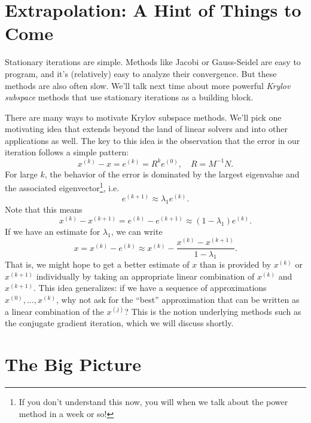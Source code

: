 \documentclass[12pt, leqno]{article}
\begin{document}

\section{Extrapolation: A Hint of Things to Come}

Stationary iterations are simple.  Methods like Jacobi or Gauss-Seidel
are easy to program, and it's (relatively) easy to analyze their
convergence.  But these methods are also often slow.  We'll talk next
time about more powerful {\em Krylov subspace} methods that use
stationary iterations as a building block.

There are many ways to motivate Krylov subspace methods.  We'll
pick one motivating idea that extends beyond
the land of linear solvers and into other applications as well.
The key to this idea is the observation that the error in our
iteration follows a simple pattern:
\[
  x^{(k)}-x = e^{(k)} = R^k e^{(0)}, \quad R = M^{-1} N.
\]
For large $k$, the behavior of the error is dominated by the largest
eigenvalue and the associated eigenvector\footnote{%
If you don't understand this now, you will when we talk about the
power method in a week or so!}, i.e.
\[
  e^{(k+1)} \approx \lambda_1 e^{(k)}.
\]
Note that this means
\[
  x^{(k)}-x^{(k+1)} = e^{(k)}-e^{(k+1)} \approx (1-\lambda_1) e^{(k)}.
\]
If we have an estimate for $\lambda_1$, we can write
\[
  x = x^{(k)} - e^{(k)} \approx
  x^{(k)}-\frac{x^{(k)}-x^{(k+1)}}{1-\lambda_1}.
\]
That is, we might hope to get a better estimate of $x$ than is
provided by $x^{(k)}$ or $x^{(k+1)}$ individually by taking an
appropriate linear combination of $x^{(k)}$ and $x^{(k+1)}$.  This
idea generalizes: if we have a sequence of approximations
$x^{(0)}, \ldots, x^{(k)}$, why not ask for the ``best'' approximation
that can be written as a linear combination of the $x^{(j)}$?
This is the notion underlying methods such as the conjugate gradient
iteration, which we will discuss shortly.

\section{The Big Picture}
\end{document}
